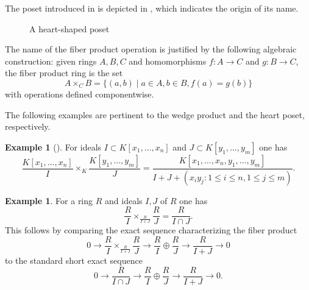 \documentclass[11pt, reqno]{amsart}
\theoremstyle{plain} %
\theoremstyle{definition}
\newtheorem{ex}[thm]{Example}
\theoremstyle{remark}
\numberwithin{equation}{section}  %
\begin{document}
The poset introduced in  is depicted in , which indicates the origin of its name.
\begin{figure}[h]
\centering
{}
    \caption{A heart-shaped poset}
    \label{heart}
\end{figure}

The name of the fiber product operation is justified by the following algebraic construction: given rings $A,B,C$ and homomorphisms $f:A\to C$ and $g:B\to C$, the fiber product ring is the set
\begin{equation}\label{eq: FP}
A\times_C B=\{(a,b) \mid a\in A, b\in B, f(a)=g(b)\}
\end{equation}
with operations defined componentwise.

The following examples are pertinent to the wedge product and the heart poset, respectively.
\begin{ex}[{\cite[Proposition 3.12]{IMS}}]\label{ex: FP wedge}
    For ideals $I\subset K[x_1,\ldots, x_n]$ and $J\subset K[y_1,\ldots, y_m]$ one has
    \[
    \frac{K[x_1,\ldots, x_n]}{I}\times_K \frac{K[y_1,\ldots, y_m]}{J}=\frac{K[x_1,\ldots, x_n, y_1, \ldots, y_m]}{I+J+(x_iy_j : 1\leq i\leq n, 1\leq j\leq m)}.
    \]
\end{ex}

\begin{ex}\label{ex: FP intersection}
   For a ring $R$ and ideals $I,J$ of $R$ one has
    \[
    \frac{R}{I}\times_{\frac{R}{I+J}} \frac{R}{J} = \frac{R}{I\cap J}.
    \]
    This follows by comparing the exact sequence characterizing the fiber product \cite[(3)]{IMS}
    \[
    0 \to  \frac{R}{I}\times_{\frac{R}{I+J}} \frac{R}{J} \to  \frac{R}{I}\oplus \frac{R}{J} \to  \frac{R}{I+J}\to 0
    \]
    to the standard short exact sequence
    \[
    0 \to  \frac{R}{I\cap J}  \to  \frac{R}{I}\oplus \frac{R}{J} \to  \frac{R}{I+J}\to 0.
    \]
\end{ex}
\end{document}
